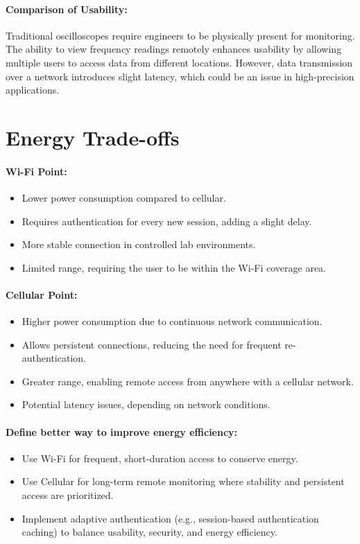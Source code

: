 \paragraph{\textbf{Comparison of Usability:}}  
Traditional oscilloscopes require engineers to be physically present for monitoring. The ability to view frequency readings remotely enhances usability by allowing multiple users to access data from different locations. However, data transmission over a network introduces slight latency, which could be an issue in high-precision applications.  

\section{Energy Trade-offs}

\paragraph{\textbf{Wi-Fi Point:}}  
\begin{itemize}
    \item Lower power consumption compared to cellular.
    \item Requires authentication for every new session, adding a slight delay.
    \item More stable connection in controlled lab environments.
    \item Limited range, requiring the user to be within the Wi-Fi coverage area.
\end{itemize}

\paragraph{\textbf{Cellular Point:}}  
\begin{itemize}
    \item Higher power consumption due to continuous network communication.
    \item Allows persistent connections, reducing the need for frequent re-authentication.
    \item Greater range, enabling remote access from anywhere with a cellular network.
    \item Potential latency issues, depending on network conditions.
\end{itemize}

\paragraph{\textbf{Define better way to improve energy efficiency:}}  
\begin{itemize}
    \item Use Wi-Fi for frequent, short-duration access to conserve energy.
    \item Use Cellular for long-term remote monitoring where stability and persistent access are prioritized.
    \item Implement adaptive authentication (e.g., session-based authentication caching) to balance usability, security, and energy efficiency.
\end{itemize}



